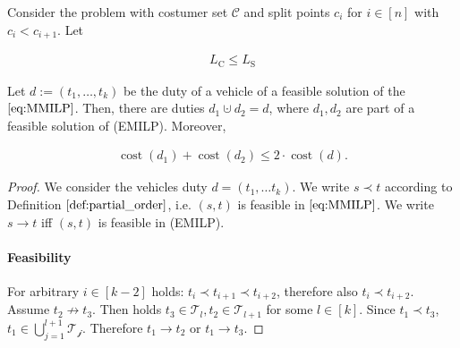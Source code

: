 \begin{theorem}

Consider the problem with costumer set $\mathcal{C}$ and split points $c_i$ for $i\in[n]$ with $c_i<c_{i+1}$. Let

\begin{align}
	L_{\operatorname{C}}\leq L_{\operatorname{S}}
\end{align}

Let $d:=\left(t_1,\dots,t_k\right)$ be the duty of a vehicle of a feasible solution of the $\eqref{eq:MMILP}$. Then, there are duties $d_1\cupdot d_2=d$, where $d_1,d_2$ are part of a feasible solution of (EMILP). Moreover,

\begin{align}
	\operatorname{cost}\left(d_1\right)+\operatorname{cost}\left(d_2\right)\leq 2\cdot\operatorname{cost}\left(d\right).
\end{align}

\end{theorem}

\begin{proof}

We consider the vehicles duty $d=\left(t_1,\dots t_k\right)$. We write $s\prec t$ according to Definition $\ref{def:partial_order}$, i.e. $(s,t)$ is feasible in $\eqref{eq:MMILP}$. We write $s\to t$ iff $(s,t)$ is feasible in (EMILP).

\paragraph{Feasibility}

For arbitrary $i\in[k-2]$ holds: $t_i\prec t_{i+1}\prec t_{i+2}$, therefore also $t_i\prec t_{i+2}$.
Assume $t_2\not\to t_3$. Then holds $t_3\in\mathcal{T}_l, t_2\in\mathcal{T}_{l+1}$ for some $l\in[k]$. Since $t_1\prec t_3$, $t_1\in\bigcup_{j=1}^{l+1}\mathcal{T_j}$. Therefore $t_1\to t_2$ or $t_1\to t_3$.

\end{proof}
